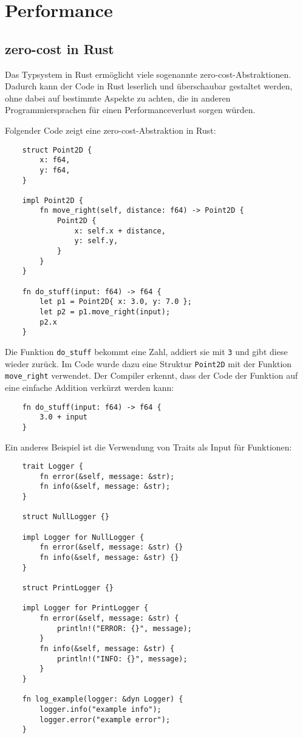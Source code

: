 \chapter{Performance}


\section{zero-cost in Rust}

Das Typsystem in Rust ermöglicht viele sogenannte zero-cost-Abstraktionen. Da\-durch kann der Code in Rust leserlich und überschaubar gestaltet werden, ohne dabei auf bestimmte Aspekte zu achten, die in anderen Programmiersprachen für einen Performanceverlust sorgen würden.

Folgender Code zeigt eine zero-cost-Abstraktion in Rust\cite{ZeroCost}:

\begin{lstlisting}
    struct Point2D {
        x: f64,
        y: f64,
    }
    
    impl Point2D {
        fn move_right(self, distance: f64) -> Point2D {
            Point2D {
                x: self.x + distance,
                y: self.y,
            }
        }
    }
    
    fn do_stuff(input: f64) -> f64 {
        let p1 = Point2D{ x: 3.0, y: 7.0 };
        let p2 = p1.move_right(input);
        p2.x
    }
\end{lstlisting}

Die Funktion \verb"do_stuff" bekommt eine Zahl, addiert sie mit \verb"3" und gibt diese wieder zurück. Im Code wurde dazu eine Struktur \verb"Point2D" mit der Funktion \verb"move_right" verwendet. Der Compiler erkennt, dass der Code der Funktion auf eine einfache Addition ver\-kürzt werden kann:

\begin{lstlisting}
    fn do_stuff(input: f64) -> f64 {
        3.0 + input
    }
\end{lstlisting}

Ein anderes Beispiel ist die Verwendung von Traits als Input für Funktionen:

\begin{lstlisting}
    trait Logger {
        fn error(&self, message: &str);
        fn info(&self, message: &str);
    }
    
    struct NullLogger {}
    
    impl Logger for NullLogger {
        fn error(&self, message: &str) {}
        fn info(&self, message: &str) {}
    }
    
    struct PrintLogger {}
    
    impl Logger for PrintLogger {
        fn error(&self, message: &str) {
            println!("ERROR: {}", message);
        }
        fn info(&self, message: &str) {
            println!("INFO: {}", message);
        }
    }
    
    fn log_example(logger: &dyn Logger) {
        logger.info("example info");
        logger.error("example error");
    }
\end{lstlisting}

